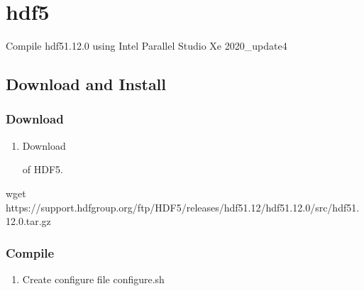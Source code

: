 \documentclass[a4paper,12pt,english]{sphinxmanual}
\begin{document}
\section{hdf5}
\label{\detokenize{compile:hdf5}}
\sphinxAtStartPar
Compile hdf5\sphinxhyphen{}1.12.0 using Intel Parallel Studio Xe 2020\_update4


\subsection{Download and Install}
\label{\detokenize{compile/hdf5_1.12.0:download-and-install}}\label{\detokenize{compile/hdf5_1.12.0::doc}}

\subsubsection{Download}
\label{\detokenize{compile/hdf5_1.12.0:download}}\begin{enumerate}
%
\item {} 
\sphinxAtStartPar
Download %
\begin{footnote}[15]\sphinxAtStartFootnote
{}
%
\end{footnote} of HDF5.

\end{enumerate}

\begin{sphinxVerbatim}[commandchars=\\\{\}]
wget https://support.hdfgroup.org/ftp/HDF5/releases/hdf5\PYGZhy{}1.12/hdf5\PYGZhy{}1.12.0/src/hdf5\PYGZhy{}1.12.0.tar.gz
\end{sphinxVerbatim}


\subsubsection{Compile}
\label{\detokenize{compile/hdf5_1.12.0:compile}}\begin{enumerate}
%
\item {} 
\sphinxAtStartPar
Create configure file configure.sh

\end{enumerate}
\end{document}
